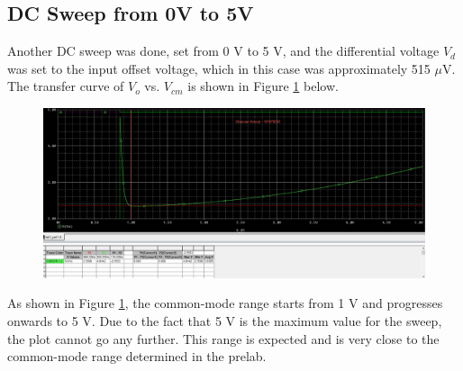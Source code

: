 \documentclass{article}
\begin{document}
	\subsection{DC Sweep from 0V to 5V}
	Another DC sweep was done, set from 0 V to 5 V, and the differential voltage $V_d$ was set to the input offset voltage, which in this case was approximately 515 $\mu$V.\\
	The transfer curve of $V_o$ vs. $V_{cm}$ is shown in Figure \ref{f:8} below.
	\begin{figure}[!ht]
		\centering
		\includegraphics[width=\textwidth]{1.3.png}
		\label{f:8}
	\end{figure}

	\noindent As shown in Figure \ref{f:8}, the common-mode range starts from 1 V and progresses onwards to 5 V. 
	Due to the fact that 5 V is the maximum value for the sweep, the plot cannot go any further. 
	This range is expected and is very close to the common-mode range determined in the prelab.
	
	\pagebreak
\end{document}
